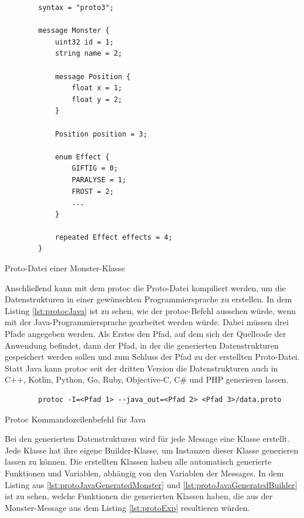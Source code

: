 \begin{listing}[htp]
    \begin{verbatim} 
        syntax = "proto3";
        
        message Monster {
            uint32 id = 1;
            string name = 2;

            message Position {
                float x = 1;
                float y = 2;
            }

            Position position = 3;

            enum Effect {
                GIFTIG = 0;
                PARALYSE = 1;
                FROST = 2;
                ...
            }

            repeated Effect effects = 4;
        }
    \end{verbatim}
    \caption{Proto-Datei einer Monster-Klasse}
    \label{lst:protoExp}
\end{listing}

Anschließend kann mit dem \ac{protoc} die Proto-Datei kompiliert werden, um die Datenstrukturen in einer gewünschten Programmiersprache zu erstellen. In dem Listing \ref{lst:protocJava} ist zu sehen, wie der \ac{protoc}-Befehl aussehen würde, wenn mit der Java-Programmiersprache gearbeitet werden würde. Dabei müssen drei Pfade angegeben werden. Als Erstes den Pfad, auf dem sich der Quellcode der Anwendung befindet, dann der Pfad, in der die generierten Datenstrukturen gespeichert werden sollen und zum Schluss der Pfad zu der erstellten Proto-Datei. Statt Java kann \ac{protoc} seit der dritten Version die Datenstrukturen auch in C++, Kotlin, Python, Go, Ruby, Objective-C, C\# und PHP generieren lassen.\cite{protobufLanguageGuide}\cite{protobufProtocolBufferJava}

\begin{listing}[htp]
    \begin{verbatim} 
        protoc -I=<Pfad 1> --java_out=<Pfad 2> <Pfad 3>/data.proto
    \end{verbatim}
    \caption{Protoc Kommandozeilenbefehl für Java\cite{protobufProtocolBufferJava}}
    \label{lst:protocJava}
\end{listing}

Bei den generierten Datenstrukturen wird für jede Message eine Klasse erstellt. Jede Klasse hat ihre eigene Builder-Klasse, um Instanzen dieser Klasse generieren lassen zu können. Die erstellten Klassen haben alle automatisch generierte Funktionen und Variablen, abhängig von den Variablen der Messages. In dem Listing aus \ref{lst:protoJavaGeneratedMonster} und \ref{lst:protoJavaGeneratedBuilder} ist zu sehen, welche Funktionen die generierten Klassen haben, die aus der Monster-Message aus dem Listing \ref{lst:protoExp} resultieren würden. 

